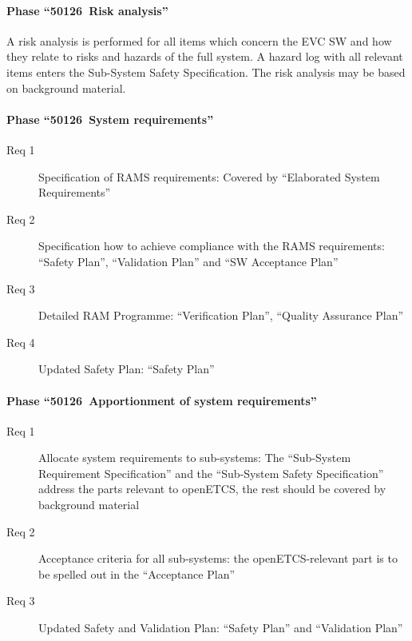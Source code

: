 \documentclass{template/openetcs_article}
\begin{document}
\paragraph{Phase ``50126~Risk analysis''}

A risk analysis is performed for all items which concern the EVC SW
and how they relate to risks and hazards of the full system. A hazard
log with all relevant items enters the Sub-System Safety
Specification. The risk analysis may be based on background material.

\paragraph{Phase ``50126~System requirements''}

\begin{description}
\item[Req 1] Specification of RAMS requirements: Covered by
  ``Elaborated System Requirements''
\item[Req 2] Specification how to achieve compliance with the RAMS requirements:
  ``Safety Plan'', ``Validation Plan'' and ``SW Acceptance Plan''
\item[Req 3] Detailed RAM Programme: ``Verification Plan'', ``Quality
  Assurance Plan''
\item[Req 4] Updated Safety Plan: ``Safety Plan''
\end{description}

\paragraph{Phase ``50126~Apportionment of system requirements''}

\begin{description}
\item[Req 1] Allocate system requirements to sub-systems: The
  ``Sub-System Requirement Specification'' and the ``Sub-System Safety
  Specification'' address the parts relevant to openETCS, the rest
  should be covered by background material
\item[Req 2] Acceptance criteria for all sub-systems: the
  openETCS-relevant part is to be spelled out in the ``Acceptance Plan''
\item[Req 3] Updated Safety and Validation Plan: ``Safety Plan'' and
  ``Validation Plan''
\end{description}

\end{document}
